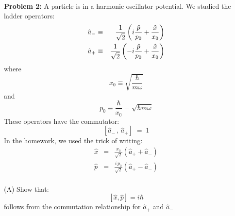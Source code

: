\documentclass[12pt]{article}
\begin{document}
\noindent
{\bf Problem 2:} A particle is in a harmonic oscillator potential.  We studied the ladder operators:
\begin{eqnarray}
\hat{a}_- &\equiv& \frac{1}{\sqrt{2}}\left(i \frac{\hat{p}}{p_0} + \frac{\hat{x}}{x_0}\right) \notag \\
\hat{a}_+ &\equiv& \frac{1}{\sqrt{2}}\left(-i \frac{\hat{p}}{p_0} + \frac{\hat{x}}{x_0} \right) \notag \\
\end{eqnarray}
where
$$x_0 \equiv \sqrt{\frac{\hbar}{m \omega}}$$
and
$$p_0 \equiv \frac{\hbar}{x_0} = \sqrt{\hbar m \omega}$$
These operators have the commutator:
$$\left[\hat{a}_-\,,\,\hat{a}_+\right] \; = \;  1$$
In the homework, we used the trick of writing:
\begin{eqnarray*}
\hat{x} &=& \frac{x_0}{\sqrt{2}} \left(\hat{a}_+ + \hat{a}_-\right)\\
\hat{p} &=& \frac{i\,p_0}{\sqrt{2}} \left(\hat{a}_+ - \hat{a}_-\right)\\
\end{eqnarray*}

\noindent
(A) Show that:
$$[\hat{x}, \hat{p}] = i\hbar$$
follows from the commutation relationship for $\hat{a}_+$ and $\hat{a}_-$
\end{document}

